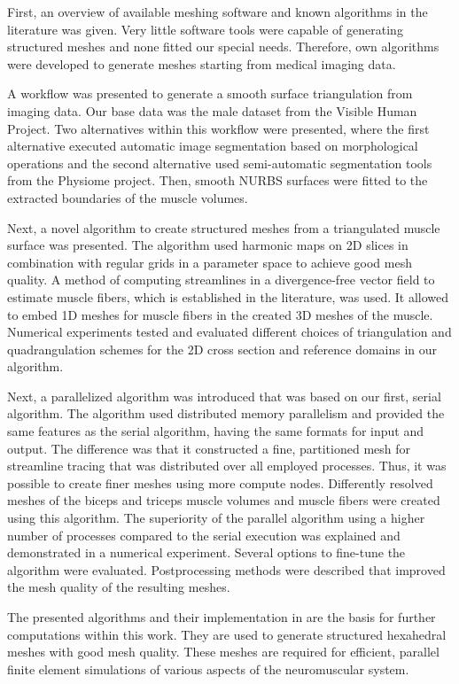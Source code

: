First, an overview of available meshing software and known algorithms in the literature was given. Very little software tools were capable of generating structured meshes and none fitted our special needs. Therefore, own algorithms were developed to generate meshes starting from medical imaging data.

A workflow was presented to generate a smooth surface triangulation from imaging data. Our base data was the male dataset from the Visible Human Project. Two alternatives within this workflow were presented, where the first alternative executed automatic image segmentation based on morphological operations and the second alternative used semi-automatic segmentation tools from the Physiome project. Then, smooth NURBS surfaces were fitted to the extracted boundaries of the muscle volumes.

Next, a novel algorithm to create structured meshes from a triangulated muscle surface was presented. The algorithm used harmonic maps on 2D slices in combination with regular grids in a parameter space to achieve good mesh quality. A method of computing streamlines in a divergence-free vector field to estimate muscle fibers, which is established in the literature, was used. It allowed to embed 1D meshes for muscle fibers in the created 3D meshes of the muscle. Numerical experiments tested and evaluated different choices of triangulation and quadrangulation schemes for the 2D cross section and reference domains in our algorithm.

Next, a parallelized algorithm was introduced that was based on our first, serial algorithm. The algorithm used distributed memory parallelism and provided the same features as the serial algorithm, having the same formats for input and output. The difference was that it constructed a fine, partitioned mesh for streamline tracing that was distributed over all employed processes. Thus, it was possible to create finer meshes using more compute nodes. Differently resolved meshes of the biceps and triceps muscle volumes and muscle fibers were created using this algorithm. The superiority of the parallel algorithm using a higher number of processes compared to the serial execution was explained and demonstrated in a numerical experiment. Several options to fine-tune the algorithm were evaluated. Postprocessing methods were described that improved the mesh quality of the resulting meshes.

The presented algorithms and their implementation in \opendihu{} are the basis for further computations within this work. They are used to generate structured hexahedral meshes with good mesh quality. These meshes are required for efficient, parallel finite element simulations of various aspects of the neuromuscular system.

